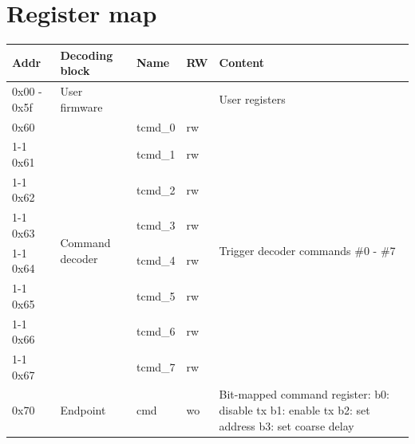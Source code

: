 \documentclass[fleqn,12pt,a4paper]{olplainarticle}
\begin{document}


\section{Register map}
\label{sect:reg_map}

\begin{table}[H]
\begin{tabularx}{\textwidth}{|
p{}|
p{}|
p{}|
p{}|
p{}|} \hline
\textbf{Addr} & \textbf{Decoding block} & \textbf{Name} & \textbf{RW} & \textbf{Content} \\\hline 
0x00 - 0x5f   & User firmware           &               &               & User registers \\\hline 
0x60          & \multirow{8}{=}{Command decoder}  & tcmd\_0 & rw & \multirow{8}{=}{Trigger decoder commands \#0 - \#7}  \\\cline{1-1}\cline{3-4}
0x61          &                         & tcmd\_1 & rw &  \\\cline{1-1}\cline{3-4}
0x62          &                         & tcmd\_2 & rw &  \\\cline{1-1}\cline{3-4}
0x63          &                         & tcmd\_3 & rw &  \\\cline{1-1}\cline{3-4}
0x64          &                         & tcmd\_4 & rw &  \\\cline{1-1}\cline{3-4}
0x65          &                         & tcmd\_5 & rw &  \\\cline{1-1}\cline{3-4}
0x66          &                         & tcmd\_6 & rw &  \\\cline{1-1}\cline{3-4}
0x67          &                         & tcmd\_7 & rw &  \\\hline 
0x70          & \multirow{6}{=}{Endpoint}  & cmd & wo & Bit-mapped command register:\newline\newline
b0: disable tx\newline
b1: enable tx\newline
b2: set address\newline
b3: set coarse delay\newline

\end{tabularx}
\end{table}
\end{document}
